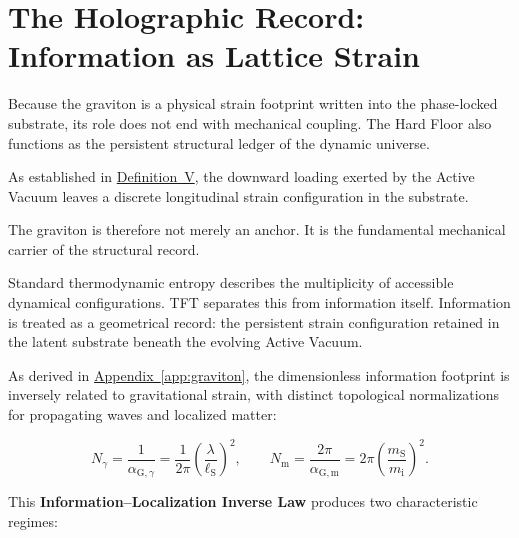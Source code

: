 \section{The Holographic Record: Information as Lattice Strain}
\label{sec:holographic_record}

Because the graviton is a physical strain footprint written into the phase-locked substrate, its role does not end with mechanical coupling. The Hard Floor also functions as the persistent structural ledger of the dynamic universe.

As established in \hyperref[def:definition_five]{Definition~V},
the downward loading exerted by the Active Vacuum leaves a discrete longitudinal strain configuration in the substrate.

The graviton is therefore not merely an anchor. It is the fundamental mechanical carrier of the structural record.

Standard thermodynamic entropy describes the multiplicity of accessible dynamical configurations. TFT separates this from information itself. Information is treated as a geometrical record: the persistent strain configuration retained in the latent substrate beneath the evolving Active Vacuum.

As derived in
\hyperref[app:graviton]{Appendix~\ref*{app:graviton}},
the dimensionless information footprint is inversely related to gravitational strain, with distinct topological normalizations for propagating waves and localized matter:

\begin{equation}
    N_{\gamma}
    =
    \frac{1}{\alpha_{\mathrm{G},\gamma}}
    =
    \frac{1}{2\pi}
    \left(
        \frac{\lambda}{\ell_{\mathrm S}}
    \right)^2,
    \qquad
    N_{\mathrm m}
    =
    \frac{2\pi}{\alpha_{\mathrm{G},\mathrm m}}
    =
    2\pi
    \left(
        \frac{m_{\mathrm S}}{m_{\mathrm i}}
    \right)^2.
    \label{eq:info_energy_inverse}
\end{equation}

This \textbf{Information--Localization Inverse Law} produces two characteristic regimes:

